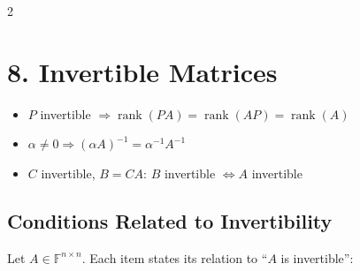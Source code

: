 \documentclass[fleqn]{article}
\begin{document}
\begin{multicols}{2}
\section*{8. Invertible Matrices}
\begin{itemize}
\item $P$ invertible $\Rightarrow \operatorname{rank}(PA)=\operatorname{rank}(AP)=\operatorname{rank}(A)$
\item $\alpha \neq 0 \Rightarrow (\alpha A)^{-1}=\alpha^{-1}A^{-1}$
\item $C$ invertible, $B=CA$: $B$ invertible $\iff A$ invertible
\end{itemize}

\subsection*{Conditions Related to Invertibility}
Let $A \in \mathbb{F}^{n\times n}$. Each item states its relation to ``$A$ is invertible'':


\end{multicols}
\end{document}

